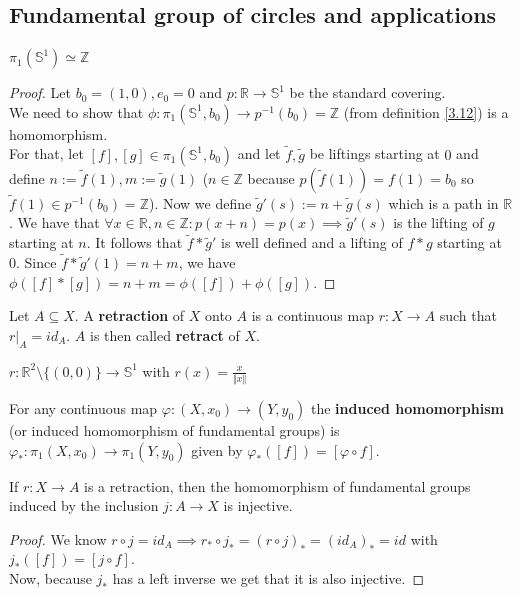 \subsection{Fundamental group of circles and applications}
\begin{theorem}\label{3.14}
    $\pi_1(\mathbb{S}^1)\simeq\mathbb{Z}$
\end{theorem}
\begin{proof}
    Let $b_0=(1,0),e_0=0$ and $p:\mathbb{R}\to\mathbb{S}^1$ be the standard covering.\\
    We need to show that $\phi:\pi_1(\mathbb{S}^1,b_0)\to p^{-1}(b_0)=\mathbb{Z}$ (from definition \ref{3.12}) is a homomorphism.\\
    For that, let $[f],[g]\in\pi_1(\mathbb{S}^1,b_0)$ and let $\tilde f,\tilde g$ be liftings starting at $0$ and define $n:=\tilde f(1),m:=\tilde g(1)$ ($n\in \mathbb{Z}$ because $p(\tilde f(1))=f(1)=b_0$ so $\tilde{f}(1)\in p^{-1}(b_0)=\mathbb{Z}$).
    Now we define $\tilde g'(s):= n+\tilde g(s)$ which is a path in $\mathbb{R}$. We have that $\forall x\in\mathbb{R},n\in\mathbb{Z}: p(x+n)=p(x)\implies \tilde g'(s)$ is the lifting of $g$ starting at $n$.
    It follows that $\tilde f*\tilde g'$ is well defined and a lifting of $f*g$ starting at $0$. Since $\tilde f*\tilde g'(1)=n+m$, we have $\phi([f]*[g])=n+m=\phi([f])+\phi([g])$.
\end{proof}
\begin{definition}\label{3.15}
    Let $A\subseteq X$. A \textbf{retraction} of $X$ onto $A$ is a continuous map $r:X\to A$ such that $r|_A=id_A$. $A$ is then called \textbf{retract} of $X$.
\end{definition}
\begin{example}\label{3.16}
    $r:\mathbb{R}^2\setminus\{(0,0)\}\to \mathbb{S}^1$ with $r(x)=\frac{x}{\Vert x\Vert}$
\end{example}
\begin{definition}\label{3.17}
    For any continuous map $\varphi:(X,x_0)\to (Y,y_0)$ the \textbf{induced homomorphism} (or induced homomorphism of fundamental groups) is $\varphi_*:\pi_1(X,x_0)\to\pi_1(Y,y_0)$ given by $\varphi_*([f])=[\varphi\circ f]$.
\end{definition}
\begin{lemma}\label{3.18}
    If $r:X\to A$ is a retraction, then the homomorphism of fundamental groups induced by the inclusion $j:A\to X$ is injective.
\end{lemma}
\begin{proof}
    We know $r\circ j=id_A\implies r_*\circ j_*=(r\circ j)_*=(id_A)_*=id$ with $j_*([f])=[j\circ f]$.\\
    Now, because $j_*$ has a left inverse we get that it is also injective.
\end{proof}
